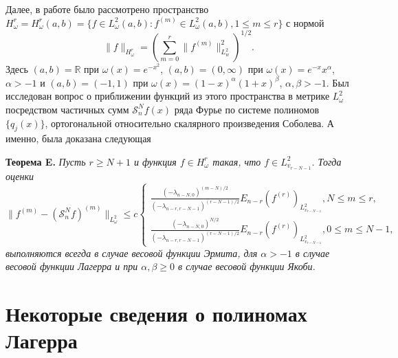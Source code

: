 Далее, в работе \cite{Approx-Juan} было рассмотрено пространство $H^r_\omega=H^r_\omega(a,b)=\{f\in L^2_\omega(a,b): f^{(m)}\in L^2_\omega(a,b), 1\le m\le r\}$ с нормой
$$
\|f\|_{H^r_\omega}=\left(\sum_{m=0}^{r}\|f^{(m)}\|^2_{L^2_w}\right)^{1/2}.
$$
Здесь $(a, b)=\mathbb{R}$ при $\omega(x)=e^{-x^2}$, $(a,b)=(0, \infty)$ при $\omega(x)=e^{-x}x^\alpha$, $\alpha>-1$ и $(a,b)=(-1, 1)$ при $\omega(x)=(1-x)^\alpha(1+x)^\beta$, $\alpha, \beta>-1$.
Был исследован вопрос о приближении функций из этого пространства в метрике $L^2_\omega$ посредством частичных сумм $\mathcal{S}_n^Nf(x)$ ряда Фурье по системе полиномов $\{q_j(x)\}$, ортогональной относительно скалярного произведения Соболева. А именно, была доказана следующая

\textbf{Теорема E.}
\textit{
Пусть $r\ge N+1$ и функция $f\in H^r_\omega$ такая, что $f\in L^2_{v_{r-N-1}}$. Тогда оценки
$$
\|f^{(m)}-(\mathcal{S}_n^Nf)^{(m)}\|_{L^2_\omega}\le c
\begin{cases}
\frac{(-\lambda_{n-N,0})^{(m-N)/2}}{(-\lambda_{n-r,r-N-1})^{(r-N-1)/2}}E_{n-r}(f^{(r)})_{L^2_{v_{r-N-1}}}, N\le m\le r, \\
\frac{(-\lambda_{n-N,0})^{N/2}}{(-\lambda_{n-r,r-N-1})^{(r-N-1)/2}}E_{n-r}(f^{(r)})_{L^2_{v_{r-N-1}}}, 0\le m\le N-1,
\end{cases}
$$
выполняются всегда в случае весовой функции Эрмита, для $\alpha>-1$ в случае весовой функции Лагерра и при $\alpha, \beta\ge0$ в случае весовой функции Якоби.
}

\section{Некоторые сведения о полиномах Лагерра}

